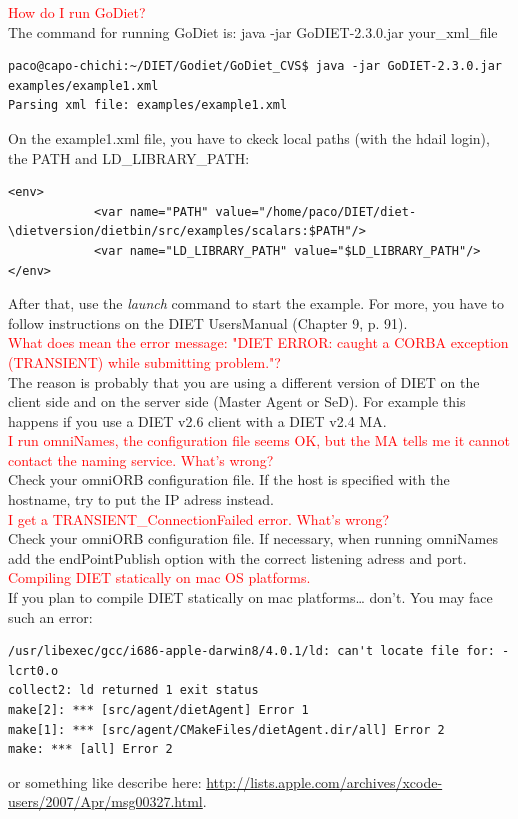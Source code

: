 \documentclass[12pt,a4paper]{book}
\newcommand{\dietversion}{2.8}
\begin{document}
\noindent \textcolor{red}{How do I run GoDiet?}\\
\noindent The command for running GoDiet is: java -jar GoDIET-2.3.0.jar your\_xml\_file
\begin{verbatim}
paco@capo-chichi:~/DIET/Godiet/GoDiet_CVS$ java -jar GoDIET-2.3.0.jar examples/example1.xml
Parsing xml file: examples/example1.xml
\end{verbatim}

\noindent On the example1.xml file, you have to ckeck local paths (with the hdail login), the PATH and LD\_LIBRARY\_PATH:

\begin{verbatim}
<env>
		    <var name="PATH" value="/home/paco/DIET/diet-\dietversion/dietbin/src/examples/scalars:$PATH"/>
		    <var name="LD_LIBRARY_PATH" value="$LD_LIBRARY_PATH"/>
</env>
\end{verbatim}

\noindent After that, use the \textit {launch} command to start the example. For more, you have to follow instructions on the DIET UsersManual (Chapter 9, p. 91).\\


\noindent \textcolor{red}{What does mean the error message: "DIET
  ERROR: caught a CORBA exception (TRANSIENT) while submitting
  problem."?}\\
\noindent The reason is probably that you are using a different
version of DIET on the client side and on the server side (Master Agent or
SeD). For example this happens if you use a DIET v2.6 client with
a DIET v2.4 MA.\\



\noindent \textcolor{red}{I run omniNames, the configuration file
  seems OK, but the MA tells me it cannot contact the naming
  service. What's wrong?}\\
\noindent Check your omniORB configuration file. If the host is
specified with the hostname, try to put the IP adress instead.\\


\noindent \textcolor{red}{I get a TRANSIENT\_ConnectionFailed error.
  What's wrong?}\\
\noindent Check your omniORB configuration file. If necessary, when
running omniNames add the endPointPublish option with the correct
listening adress and port.\\


\noindent \textcolor{red}{Compiling DIET statically on mac OS
  platforms.}\\
\noindent If you plan to compile DIET statically on mac platforms\dots
don't. You may face such an error:
\begin{verbatim}
/usr/libexec/gcc/i686-apple-darwin8/4.0.1/ld: can't locate file for: -lcrt0.o
collect2: ld returned 1 exit status
make[2]: *** [src/agent/dietAgent] Error 1
make[1]: *** [src/agent/CMakeFiles/dietAgent.dir/all] Error 2
make: *** [all] Error 2
\end{verbatim}
or something like describe here:
\url{http://lists.apple.com/archives/xcode-users/2007/Apr/msg00327.html}.\\ 
\end{document}

